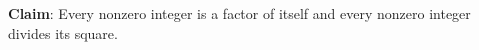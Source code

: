 
{\bf Claim}: Every nonzero integer is a factor of itself and 
every nonzero integer divides its square.

\vfill